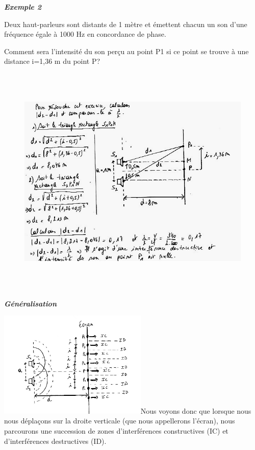 \emph{\textbf{Exemple 2}}

Deux haut-parleurs sont distants de 1 mètre et émettent chacun un son
d'une fréquence égale à 1000 Hz en concordance de phase.

Comment sera l'intensité du son perçu au point P1 si ce point se trouve
à une distance i=1,36 m du point P?

\begin{figure}
\centering
\includegraphics[width=15.545cm,height=11.171cm]{Pictures/100000010000025F000001BE110A2F11D2815100.png}
\caption{}
\end{figure}

\emph{\textbf{Généralisation}}

\includegraphics[width=7.086cm,height=5.068cm]{Pictures/10000001000001CB00000148F2D7DB2B0F2EC580.png}Nous
voyons donc que lorsque nous nous déplaçons sur la droite verticale (que
nous appellerons l'écran), nous parcourons une succession de zones
d'interférences constructives (IC) et d'interférences destructives (ID).

